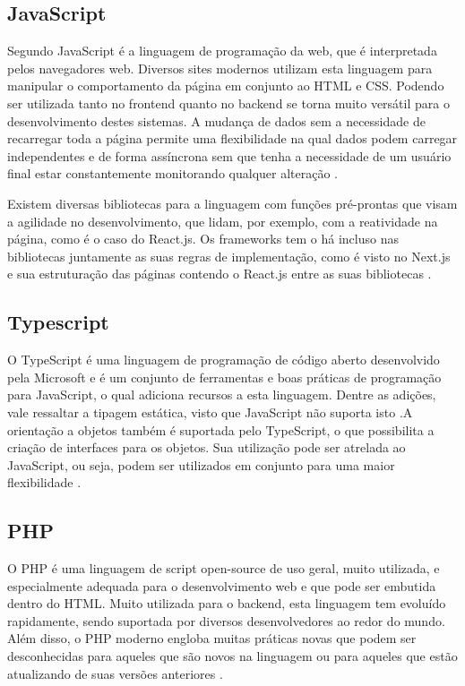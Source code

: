\subsection{JavaScript}
Segundo  JavaScript é a linguagem de programação da web, que é interpretada pelos navegadores web. Diversos sites modernos utilizam esta linguagem para manipular o comportamento da página em conjunto ao HTML e CSS. Podendo ser utilizada tanto no frontend quanto no backend se torna muito versátil para o desenvolvimento destes sistemas. A mudança de dados sem a necessidade de recarregar toda a página permite uma flexibilidade na qual dados podem carregar independentes e de forma assíncrona sem que tenha a necessidade de um usuário final estar constantemente monitorando qualquer alteração \cite{FLANAGAN}.

Existem diversas bibliotecas para a linguagem com funções pré-prontas que visam a agilidade no desenvolvimento, que lidam, por exemplo, com a reatividade na página, como é o caso do React.js. Os frameworks tem o há incluso nas bibliotecas juntamente as suas regras de implementação, como é visto no Next.js e sua estruturação das páginas contendo o React.js entre as suas bibliotecas \cite{ROBBINS}.

\subsection{Typescript}
O TypeScript é uma linguagem de programação de código aberto desenvolvido pela Microsoft e é um conjunto de ferramentas e boas práticas de programação para JavaScript, o qual adiciona recursos a esta linguagem. Dentre as adições, vale ressaltar a tipagem estática, visto que JavaScript não suporta isto \cite{TYPESCRIPT}.A orientação a objetos também é suportada pelo TypeScript, o que possibilita a criação de interfaces para os objetos. Sua utilização pode ser atrelada ao JavaScript, ou seja, podem ser utilizados em conjunto para uma maior flexibilidade \cite{CHERNY}.

\subsection{PHP}
O PHP é uma linguagem de script open-source de uso geral, muito utilizada, e especialmente adequada para o desenvolvimento web e que pode ser embutida dentro do HTML. Muito utilizada para o backend, esta linguagem tem evoluído rapidamente, sendo suportada por diversos desenvolvedores ao redor do mundo. Além disso, o PHP moderno engloba muitas práticas novas que podem ser desconhecidas para aqueles que são novos na linguagem ou para aqueles que estão atualizando de suas versões anteriores \cite{LOCKHART}.

